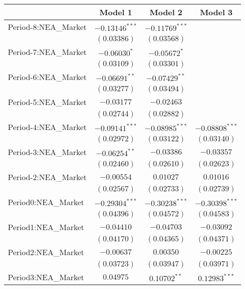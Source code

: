 
\begin{tabular}{l c c c}
\hline
 & Model 1 & Model 2 & Model 3 \\
\hline
Period-8:NEA\_Market & $-0.13146^{***}$ & $-0.11769^{***}$ &                  \\
                     & $(0.03386)$      & $(0.03568)$      &                  \\
Period-7:NEA\_Market & $-0.06030^{*}$   & $-0.05672^{*}$   &                  \\
                     & $(0.03109)$      & $(0.03301)$      &                  \\
Period-6:NEA\_Market & $-0.06691^{**}$  & $-0.07429^{**}$  &                  \\
                     & $(0.03277)$      & $(0.03494)$      &                  \\
Period-5:NEA\_Market & $-0.03177$       & $-0.02463$       &                  \\
                     & $(0.02744)$      & $(0.02882)$      &                  \\
Period-4:NEA\_Market & $-0.09141^{***}$ & $-0.08985^{***}$ & $-0.08808^{***}$ \\
                     & $(0.02972)$      & $(0.03122)$      & $(0.03140)$      \\
Period-3:NEA\_Market & $-0.06254^{**}$  & $-0.03386$       & $-0.03357$       \\
                     & $(0.02460)$      & $(0.02610)$      & $(0.02623)$      \\
Period-2:NEA\_Market & $-0.00554$       & $0.01027$        & $0.01016$        \\
                     & $(0.02567)$      & $(0.02733)$      & $(0.02739)$      \\
Period0:NEA\_Market  & $-0.29304^{***}$ & $-0.30238^{***}$ & $-0.30398^{***}$ \\
                     & $(0.04396)$      & $(0.04572)$      & $(0.04583)$      \\
Period1:NEA\_Market  & $-0.04410$       & $-0.04703$       & $-0.03092$       \\
                     & $(0.04170)$      & $(0.04365)$      & $(0.04371)$      \\
Period2:NEA\_Market  & $-0.00637$       & $0.00350$        & $-0.00225$       \\
                     & $(0.03723)$      & $(0.03947)$      & $(0.03971)$      \\
Period3:NEA\_Market  & $0.04975$        & $0.10702^{**}$   & $0.12983^{***}$  \\

\end{tabular}
